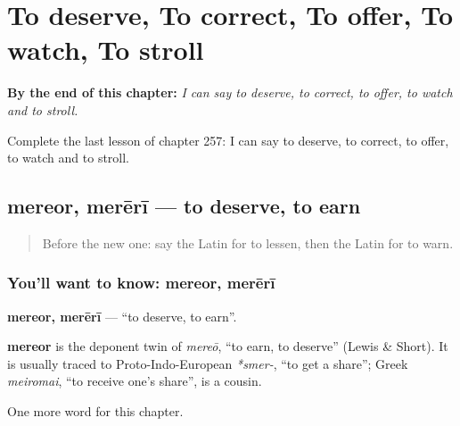
\chapter{To deserve, To correct, To offer, To watch, To stroll}
\label{ch:la-to-deserve-to-correct-to-offer-to-watch-to-stroll}

\begin{chapteropening}
\textbf{By the end of this chapter:} \emph{I can say to deserve, to correct, to offer, to watch and to stroll.}

Complete the last lesson of chapter 257: I can say to deserve, to correct, to offer, to watch and to stroll.
\end{chapteropening}

\section[mereor, merērī]{mereor, merērī — to deserve, to earn}

\label{lesson:LA-C257-mereor}



\begin{quote}
Before the new one: say the Latin for to lessen, then the Latin for to warn.
\end{quote}

\subsection*{You'll want to know: mereor, merērī}
\textbf{mereor, merērī} — \textquotedblleft{}to deserve, to earn\textquotedblright{}.

\begin{cousinweb}
\textbf{mereor} is the deponent twin of \emph{mereō}, \textquotedblleft{}to earn, to deserve\textquotedblright{} (Lewis \& Short). It is usually traced to Proto-Indo-European \emph{*smer-}, \textquotedblleft{}to get a share\textquotedblright{}; Greek \emph{meiromai}, \textquotedblleft{}to receive one's share\textquotedblright{}, is a cousin.
\end{cousinweb}

\begin{grammarlens}[title={What you've built}]
One more word for this chapter.
\end{grammarlens}

